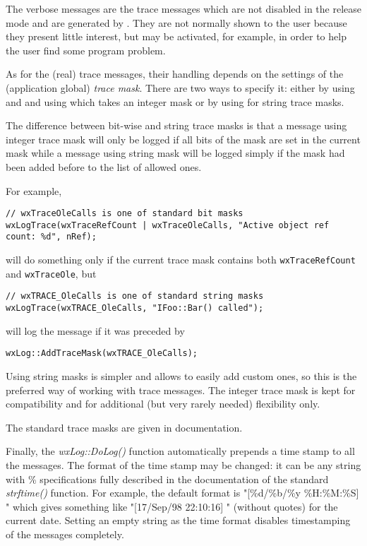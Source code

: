 The verbose messages are the trace messages which are not disabled in the
release mode and are generated by . They
are not normally shown to the user because they present little interest, but
may be activated, for example, in order to help the user find some program
problem.

As for the (real) trace messages, their handling depends on the settings of
the (application global) {\it trace mask}. There are two ways to specify it:
either by using  and 
 and using 
 which takes an integer mask or by using 
 for string trace masks.

The difference between bit-wise and string trace masks is that a message using
integer trace mask will only be logged if all bits of the mask are set in the
current mask while a message using string mask will be logged simply if the
mask had been added before to the list of allowed ones.

For example,

\begin{verbatim}
// wxTraceOleCalls is one of standard bit masks
wxLogTrace(wxTraceRefCount | wxTraceOleCalls, "Active object ref count: %d", nRef);
\end{verbatim}
will do something only if the current trace mask contains both 
{\tt wxTraceRefCount} and {\tt wxTraceOle}, but

\begin{verbatim}
// wxTRACE_OleCalls is one of standard string masks
wxLogTrace(wxTRACE_OleCalls, "IFoo::Bar() called");
\end{verbatim}

will log the message if it was preceded by

\begin{verbatim}
wxLog::AddTraceMask(wxTRACE_OleCalls);
\end{verbatim}

Using string masks is simpler and allows to easily add custom ones, so this is
the preferred way of working with trace messages. The integer trace mask is
kept for compatibility and for additional (but very rarely needed) flexibility
only.

The standard trace masks are given in  
documentation.

Finally, the {\it wxLog::DoLog()} function automatically prepends a time stamp
to all the messages. The format of the time stamp may be changed: it can be
any string with \% specifications fully described in the documentation of the
standard {\it strftime()} function. For example, the default format is
"[\%d/\%b/\%y \%H:\%M:\%S] " which gives something like "[17/Sep/98 22:10:16] "
(without quotes) for the current date. Setting an empty string as the time
format disables timestamping of the messages completely.

